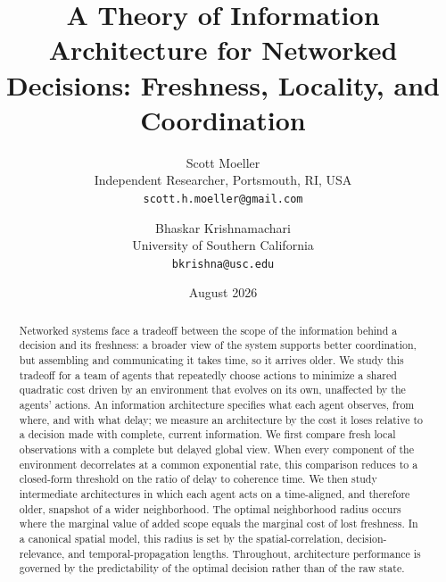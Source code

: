 \documentclass[11pt]{article}
\begin{document}
\title{A Theory of Information Architecture for Networked Decisions:
Freshness, Locality, and Coordination}
\author{
Scott Moeller\\
\small Independent Researcher, Portsmouth, RI, USA\\
\small \texttt{scott.h.moeller@gmail.com}
\and
Bhaskar Krishnamachari\\
\small University of Southern California\\
\small \texttt{bkrishna@usc.edu}
}

\date{August 2026}


\maketitle

\begin{abstract}
Networked systems face a tradeoff between the scope of the information behind a
decision and its freshness: a broader view of the system supports better
coordination, but assembling and communicating it takes time, so it arrives
older. We study this
tradeoff for a team of agents that repeatedly choose actions to minimize a
shared quadratic cost driven by an environment that evolves on its own,
unaffected by the agents' actions. An information architecture specifies what
each agent observes, from where, and with what delay; we measure an architecture
by the cost it loses relative to a decision made with complete, current
information. We first compare fresh local observations with a complete but
delayed global view. When every component of the environment decorrelates at a
common exponential rate, this comparison reduces to a closed-form threshold on
the ratio of delay to coherence time. We then study intermediate architectures
in which each agent acts on a time-aligned, and therefore older, snapshot of a
wider neighborhood. The optimal neighborhood radius occurs where the marginal
value of added scope equals the marginal cost of lost freshness. In a canonical
spatial model, this radius is set by the spatial-correlation,
decision-relevance, and temporal-propagation lengths. Throughout, architecture
performance is governed by the predictability of the optimal decision rather
than of the raw state.
\end{abstract}
\end{document}

